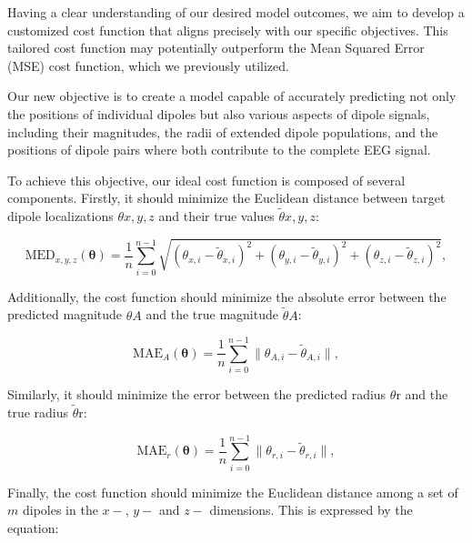 \documentclass[a4paper, UKenglish, 11pt]{uiomaster}
\begin{document}
Having a clear understanding of our desired model outcomes, we aim to develop a customized cost function that aligns precisely with our specific objectives. This tailored cost function may potentially outperform the Mean Squared Error (MSE) cost function, which we previously utilized.

Our new objective is to create a model capable of accurately predicting not only the positions of individual dipoles but also various aspects of dipole signals, including their magnitudes, the radii of extended dipole populations, and the positions of dipole pairs where both contribute to the complete EEG signal.

To achieve this objective, our ideal cost function is composed of several components. Firstly, it should minimize the Euclidean distance between target dipole localizations ${\theta}{x,y,z}$ and their true values $\tilde{\theta}{x,y,z}$:

\begin{equation}
    \text{MED}_{x,y,z}(\boldsymbol{\theta}) = \frac{1}{n}\sum_{i=0}^{n-1}\sqrt{(\theta_{x,i} - \tilde{\theta}_{x,i})^2 + (\theta_{y,i} - \tilde{\theta}_{y,i})^2 + (\theta_{z,i} - \tilde{\theta}_{z,i})^2},
\label{eq:MED}
\end{equation}

Additionally, the cost function should minimize the absolute error between the predicted magnitude ${\theta}{A}$ and the true magnitude $\tilde{\theta}{A}$:

\begin{equation}
    \text{MAE}_{A}(\boldsymbol{\theta}) = \frac{1}{n} \sum_{i=0}^{n-1} \| \theta_{A,i} - \tilde{\theta}_{A,i} \|,
\label{eq:MAE_A}
\end{equation}

Similarly, it should minimize the error between the predicted radius ${\theta}{\text{r}}$ and the true radius $\tilde{\theta}{\text{r}}$:

\begin{equation}
    \text{MAE}_{r}(\boldsymbol{\theta}) = \frac{1}{n} \sum_{i=0}^{n-1} \| \theta_{r,i} - \tilde{\theta}_{r,i} \|,
\label{eq:MAE_r}
\end{equation}

Finally, the cost function should minimize the Euclidean distance among a set of $m$ dipoles in the $x-$, $y-$ and $z-$ dimensions. This is expressed by the equation:
\end{document}
